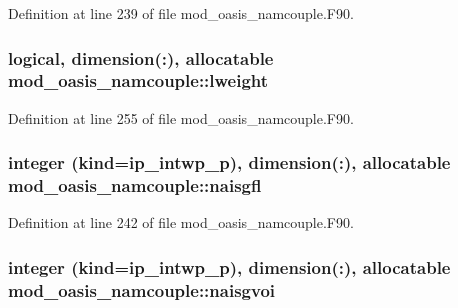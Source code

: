 Definition at line 239 of file mod\+\_\+oasis\+\_\+namcouple.\+F90.

\hypertarget{classmod__oasis__namcouple_a8d88d0c1b22ea43a9429f9e3a653a64b}{
\subsubsection[{lweight}]{\setlength{\rightskip}{0pt plus 5cm}logical, dimension(\+:), allocatable mod\+\_\+oasis\+\_\+namcouple\+::lweight\hspace{0.3cm}{\ttfamily [private]}}}\label{classmod__oasis__namcouple_a8d88d0c1b22ea43a9429f9e3a653a64b}


Definition at line 255 of file mod\+\_\+oasis\+\_\+namcouple.\+F90.

\hypertarget{classmod__oasis__namcouple_ada0ad7614eba9cc3a1e168484a520c33}{
\subsubsection[{naisgfl}]{\setlength{\rightskip}{0pt plus 5cm}integer (kind=ip\+\_\+intwp\+\_\+p), dimension(\+:), allocatable mod\+\_\+oasis\+\_\+namcouple\+::naisgfl\hspace{0.3cm}{\ttfamily [private]}}}\label{classmod__oasis__namcouple_ada0ad7614eba9cc3a1e168484a520c33}


Definition at line 242 of file mod\+\_\+oasis\+\_\+namcouple.\+F90.

\hypertarget{classmod__oasis__namcouple_a87c0bb7c0a2cccbb673dcaf35e3dec50}{
\subsubsection[{naisgvoi}]{\setlength{\rightskip}{0pt plus 5cm}integer (kind=ip\+\_\+intwp\+\_\+p), dimension(\+:), allocatable mod\+\_\+oasis\+\_\+namcouple\+::naisgvoi\hspace{0.3cm}{\ttfamily [private]}}}\label{classmod__oasis__namcouple_a87c0bb7c0a2cccbb673dcaf35e3dec50}


